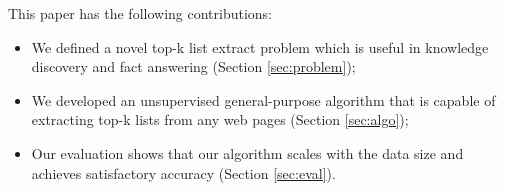 This paper has the following contributions:
\begin{itemize}
\item We defined a novel top-k list extract problem which is useful in
knowledge discovery and fact answering (Section \ref{sec:problem});
\item We developed an unsupervised general-purpose algorithm that 
is capable of extracting top-k lists from any web pages 
(Section \ref{sec:algo});
\item Our evaluation shows that our algorithm scales with the data size
and achieves satisfactory accuracy (Section \ref{sec:eval}).
\end{itemize}
